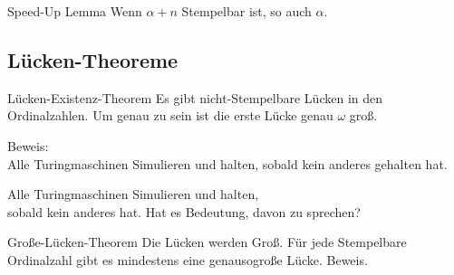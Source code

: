 \begin{frame}[c]{Speed-Up Lemma}
    \Large
    Wenn $\alpha + n$ Stempelbar ist, so auch $\alpha$.
\end{frame}



\subsection{Lücken-Theoreme}


\begin{frame}[c]{Lücken-Existenz-Theorem}
    \Large
    Es gibt nicht-Stempelbare Lücken in den Ordinalzahlen. Um genau zu sein ist
    die erste Lücke genau $\omega$ groß. \\
    \pause

    Beweis: \pause \\
    Alle Turingmaschinen Simulieren und halten, sobald kein anderes gehalten hat.
\end{frame}


\begin{frame}[c]{Alle Turingmaschinen}
    \Large
     Simulieren und halten, \\
    sobald kein anderes  hat.
    \newline \newline \newline
    Hat es Bedeutung, davon zu sprechen?
\end{frame}


\begin{frame}[c]{Große-Lücken-Theorem}
    \Large
    Die Lücken werden Groß. Für jede Stempelbare Ordinalzahl gibt es mindestens
    eine genausogroße Lücke.
    \newline
    \newline
    \pause
    Beweis.
\end{frame}


